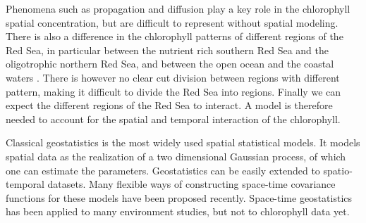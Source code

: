 Phenomena such as propagation and diffusion play a key role in the chlorophyll spatial concentration, but are difficult to represent without spatial modeling. There is also a difference in the chlorophyll patterns of different regions of the Red Sea, in particular between the nutrient rich southern Red Sea and the oligotrophic northern Red Sea, and between the open ocean and the coastal waters \cite{Raitsos2013}. There is however no clear cut division between regions with different pattern, making it difficult to divide the Red Sea into regions. Finally we can expect the different regions of the Red Sea to interact. A model is therefore needed to account for the spatial and temporal interaction of the chlorophyll.

Classical geostatistics is the most widely used spatial statistical models. It models spatial data as the realization of a two dimensional Gaussian process, of which one can estimate the parameters. Geostatistics can be easily extended to spatio-temporal datasets. Many flexible ways of constructing space-time covariance functions for these models have been proposed recently. Space-time geostatistics has been applied to many environment studies, but not to chlorophyll data yet.
